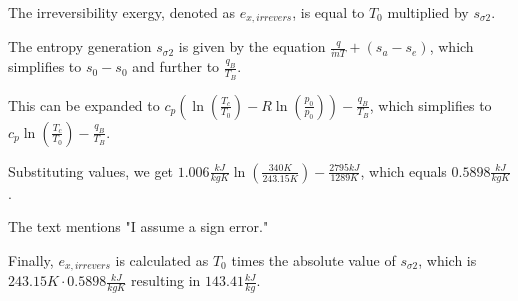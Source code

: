 The irreversibility exergy, denoted as \( e_{x,irrevers} \), is equal to \( T_0 \) multiplied by \( s_{\sigma 2} \).

The entropy generation \( s_{\sigma 2} \) is given by the equation \( \frac{q}{\dot{m} T} + (s_a - s_e) \), which simplifies to \( s_0 - s_0 \) and further to \( \frac{q_B}{T_B} \).

This can be expanded to \( c_p \left( \ln \left( \frac{T_c}{T_0} \right) - R \ln \left( \frac{p_0}{p_0} \right) \right) - \frac{q_B}{T_B} \), which simplifies to \( c_p \ln \left( \frac{T_c}{T_0} \right) - \frac{q_B}{T_B} \).

Substituting values, we get \( 1.006 \frac{kJ}{kgK} \ln \left( \frac{340 K}{243.15 K} \right) - \frac{2795 kJ}{1289 K} \), which equals \( 0.5898 \frac{kJ}{kgK} \).

The text mentions "I assume a sign error."

Finally, \( e_{x,irrevers} \) is calculated as \( T_0 \) times the absolute value of \( s_{\sigma 2} \), which is \( 243.15 K \cdot 0.5898 \frac{kJ}{kgK} \) resulting in \( 143.41 \frac{kJ}{kg} \).